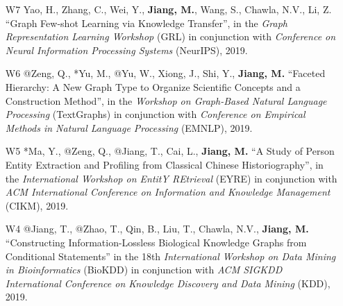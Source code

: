 \documentclass[10pt]{article}
\newenvironment{myindentpar}[1]%
{\begin{list}{}%
         {\setlength{\leftmargin}{#1}}%
         \item[]%
}
{\end{list}}
\newcounter{list}
\newcommand{\hide}[1]{}
\begin{document}
\begin{myindentpar}{0.00cm}
\begin{enumerate}[leftmargin=.5cm]
\item[W7] Yao, H., Zhang, C., Wei, Y., \textbf{Jiang, M.}, Wang, S., Chawla, N.V., Li, Z. ``Graph Few-shot Learning via Knowledge Transfer'', in the \textit{Graph Representation Learning Workshop} (GRL) in conjunction with \textit{Conference on Neural Information Processing Systems} (NeurIPS), 2019.
	
	\hide{\vspace{-0.1cm}\hspace{0.5cm}{\small \emph{I made 5\% contribution. I joined the discussions and reviewed the paper.}}}
	
\item[W6] @Zeng, Q., *Yu, M., @Yu, W., Xiong, J., Shi, Y., \textbf{Jiang, M.} ``Faceted Hierarchy: A New Graph Type to Organize Scientific Concepts and a Construction Method'', in the \textit{Workshop on Graph-Based Natural Language Processing} (TextGraphs) in conjunction with \textit{Conference on Empirical Methods in Natural Language Processing} (EMNLP), 2019.

	\hide{\vspace{-0.1cm}\hspace{0.5cm}{\small \emph{I conceived the idea and wrote the paper. Mr. Zeng designed the study, and completed the experiments.}}}
	
\item[W5] *Ma, Y., @Zeng, Q., @Jiang, T., Cai, L., \textbf{Jiang, M.} ``A Study of Person Entity Extraction and Profiling from Classical Chinese Historiography'', in the \textit{International Workshop on EntitY REtrieval} (EYRE) in conjunction with \textit{ACM International Conference on Information and Knowledge Management} (CIKM), 2019.

	\hide{\vspace{-0.1cm}\hspace{0.5cm}{\small \emph{I conceived the idea. Mr. Ma designed the study, completed the experiments, and wrote the paper. I edited the paper.}}}

\item[W4] @Jiang, T., @Zhao, T., Qin, B., Liu, T., Chawla, N.V., \textbf{Jiang, M.} ``Constructing Information-Lossless Biological Knowledge Graphs from Conditional Statements'' in the 18th \textit{International Workshop on Data Mining in Bioinformatics} (BioKDD) in conjunction with \textit{ACM SIGKDD International Conference on Knowledge Discovery and Data Mining} (KDD), 2019.

	\hide{\vspace{-0.1cm}\hspace{0.5cm}{\small \emph{Mr. Jiang conceived the idea and wrote the paper. I edited the paper.}}}
	

\end{enumerate}
\end{myindentpar}
\end{document}
